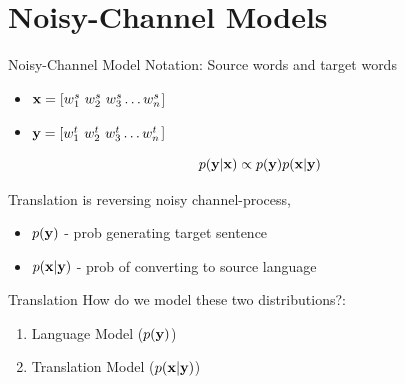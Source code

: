 \documentclass{beamer}
\begin{document}


\section{Noisy-Channel Models}

\begin{frame}{Noisy-Channel Model}
  Notation: Source words and target words
  \begin{itemize}
  \item $\mathbf{x}  = [ w^s_1\ w^s_2\ w^s_3\ldots w^s_n $] 
  \item $\mathbf{y} =  [w^t_1\ w^t_2\ w^t_3\ldots w^t_n $] 
  \end{itemize}

  \[ p(\mathbf{y} | \mathbf{x}) \propto p(\mathbf{y}) p(\mathbf{x} | \mathbf{y}) \] 


  Translation is reversing noisy channel-process,
  \begin{itemize}
  \item $p(\mathbf{y})$ - prob generating target sentence
  \item $p(\mathbf{x} | \mathbf{y})$ - prob of converting to source language
  \end{itemize}
\end{frame}

\begin{frame}{Translation}
  How do we model these two distributions?:
  \air
  
  \begin{enumerate}
  \item Language Model ($p(\mathbf{y})$) 
    \air 

  \item Translation Model ($p(\mathbf{x} | \mathbf{y})$) 
  \end{enumerate}
\end{frame}
\end{document}
